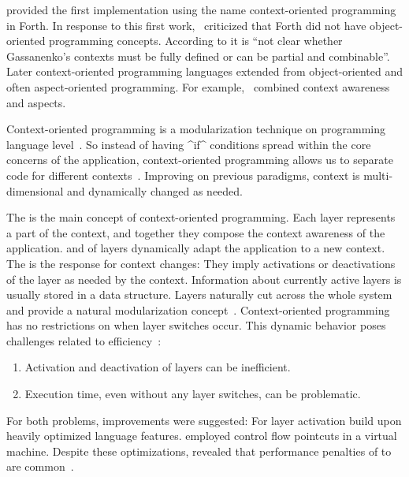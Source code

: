\citet{gassanenko1993context,gassanenko1998context} provided the first implementation using the name context-oriented programming in Forth.
In response to this first work, \citet{costanza2006efficientlayeractivation}~criticized that Forth did not have object-oriented programming concepts.
According to \citeauthor{costanza2006efficientlayeractivation} it is \enquote{not clear whether Gassanenko’s contexts must be fully defined or can be partial and combinable}.
Later context-oriented programming languages extended from object-oriented and often aspect-oriented programming.
For example, \citet{tanter2006context}~combined context awareness and aspects.

Context-oriented programming is a modularization technique on programming language level~\cite{appeltauer2008dedicated}.
So instead of having ^if^ conditions spread within the core concerns of the application, context-oriented programming allows us to separate code for different contexts~\cite{dey2000towards,salvaneschi2012context,schippers2010contextoperational}.
Improving on previous paradigms, context is multi-dimensional and dynamically changed as needed.

The  is the main concept of context-oriented programming.
Each layer represents a part of the context, and together they compose the context awareness of the application.
 and  of layers dynamically adapt the application to a new context.
The  is the response for context changes:
They imply activations or deactivations of the layer as needed by the context.
Information about currently active layers is usually stored in a data structure.
Layers naturally cut across the whole system and provide a natural modularization concept~\cite{appeltauer2009contextcomparision}.
Context-oriented programming has no restrictions on when layer switches occur.
This dynamic behavior poses challenges related to efficiency~\cite{raab2015global,appeltauer2009contextcomparision}:


\begin{enumerate}
\item Activation and deactivation of layers can be inefficient.
\item Execution time, even without any layer switches, can be problematic.
\end{enumerate}

For both problems, improvements were suggested:
For layer activation \citet{costanza2006efficientlayeractivation} build upon heavily optimized language features.
\citet{bockisch2006efficientcontrolflow} employed control flow pointcuts in a virtual machine.
Despite these optimizations, \citet{appeltauer2009contextcomparision} revealed that performance penalties of  to  are common~\cite{raab2015global}.


